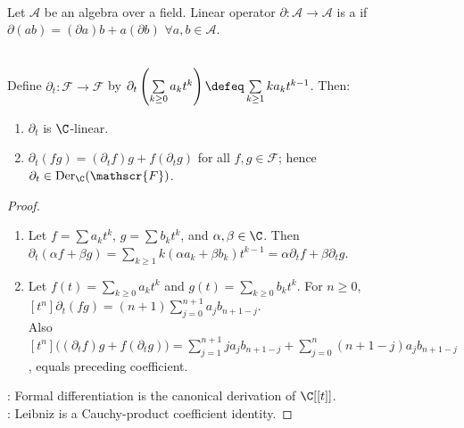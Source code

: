 \begin{definition} \label{def:derivation-on-an-algebra} \\
Let $\mathcal{A}$ be an algebra over a field. Linear operator $\partial:\mathcal{A}\to\mathcal{A}$ is a  if $\partial(ab)=(\partial a)b+a(\partial b)$ $\forall a,b\in\mathcal{A}$.
\end{definition}

\begin{proposition} \label{prop:formal-derivative-is-derivation} \\
Define $\partial_t:\mathscr{F}\to\mathscr{F}$ by $\partial_t\left(\sum\limits_{k\geq0}a_kt^k\right) \defeq \sum\limits_{k\geq1}ka_kt^{k-1}$. Then:
\begin{enumerate}[label=(\roman*)]
\setlength{\itemsep}{0pt}
\item $\partial_t$ is $\C$-linear.
\item $\partial_t(fg)=(\partial_t f)g+f(\partial_t g)$ for all $f,g\in\mathscr{F}$; hence $\partial_t\in\operatorname{Der}_{\C}(\mathscr{F})$.
\end{enumerate}
\begin{proof}
\begin{enumerate}[label=(\roman*)]
\setlength{\itemsep}{0pt}
\item Let $f=\sum a_kt^k$, $g=\sum b_kt^k$, and $\alpha,\beta\in\C$. Then $\partial_t(\alpha f+\beta g)=\sum\limits_{k\geq1}k(\alpha a_k+\beta b_k)t^{k-1}=\alpha\partial_t f+\beta\partial_t g$.
\item Let $f(t)=\sum\limits_{k\geq0}a_kt^k$ and $g(t)=\sum\limits_{k\geq0}b_kt^k$. For $n\geq0$, $[t^n]\partial_t(fg)=(n+1)\sum\limits_{j=0}^{n+1}a_jb_{n+1-j}$.\\
Also $[t^n]\bigl((\partial_t f)g+f(\partial_t g)\bigr)=\sum\limits_{j=1}^{n+1}ja_jb_{n+1-j}+\sum\limits_{j=0}^{n}(n+1-j)a_jb_{n+1-j}$, equals preceding coefficient.
\end{enumerate}
: Formal differentiation is the canonical derivation of $\C[[t]]$.\\
: Leibniz is a Cauchy-product coefficient identity.
\end{proof}
\end{proposition}


